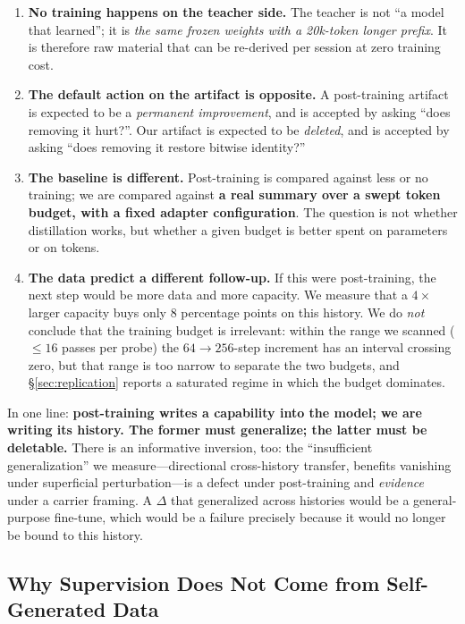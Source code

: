 \documentclass[sigconf,nonacm]{acmart}
\begin{document}
\begin{enumerate}[leftmargin=1.2em]
\item \textbf{No training happens on the teacher side.} The teacher is not ``a model that learned''; it
is \emph{the same frozen weights with a 20k-token longer prefix}. It is therefore raw material that can
be re-derived per session at zero training cost.
\item \textbf{The default action on the artifact is opposite.} A post-training artifact is expected to be
a \emph{permanent improvement}, and is accepted by asking ``does removing it hurt?''. Our artifact is
expected to be \emph{deleted}, and is accepted by asking ``does removing it restore bitwise identity?''
\item \textbf{The baseline is different.} Post-training is compared against less or no training; we are
compared against \textbf{a real summary over a swept token budget, with a fixed adapter configuration}. The
question is not whether
distillation works, but whether a given budget is better spent on parameters or on tokens.
\item \textbf{The data predict a different follow-up.} If this were post-training, the next step would
be more data and more capacity. We measure that a $4\times$ larger capacity buys only 8 percentage points on
this history. We do \emph{not} conclude that the training budget is irrelevant: within the range we scanned
($\le 16$ passes per probe) the $64\to256$-step increment has an interval crossing zero, but that range is too
narrow to separate the two budgets, and \S\ref{sec:replication} reports a saturated regime in which the budget
dominates.
\end{enumerate}

In one line: \textbf{post-training writes a capability into the model; we are writing its history. The
former must generalize; the latter must be deletable.} There is an informative inversion, too: the
``insufficient generalization'' we measure---directional cross-history transfer, benefits vanishing under
superficial perturbation---is a defect under post-training and \emph{evidence} under a carrier framing.
A $\Delta$ that generalized across histories would be a general-purpose fine-tune, which would be a
failure precisely because it would no longer be bound to this history.

\subsection{Why Supervision Does Not Come from Self-Generated Data}
\end{document}
